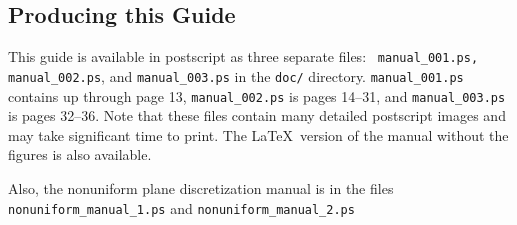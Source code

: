 \subsection{Producing this Guide}

This guide is available in postscript as three separate files: {\tt
manual\_001.ps, manual\_002.ps}, and {\tt manual\_003.ps} in
the {\tt doc/} directory.  {\tt manual\_001.ps} contains up through
page 13, {\tt manual\_002.ps} is pages 14--31, and {\tt manual\_003.ps}
is pages 32--36.  Note that these files contain many detailed
postscript images and may take significant time to print.  The
\LaTeX\ version of the manual without the figures is also available.

Also, the nonuniform plane discretization manual is in the files {\tt
  nonuniform\_manual\_1.ps} and {\tt nonuniform\_manual\_2.ps }
